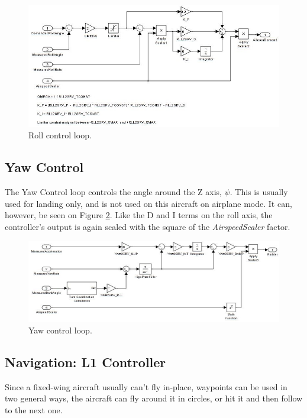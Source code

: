 \begin{figure}[H]
\centering
  \includegraphics[width=\linewidth]{figs/roll_control_loop.jpg}
  \caption{Roll control loop.}
  \label{fig:roll_loop}
\end{figure}

\subsection{Yaw Control}
The Yaw Control loop controls the angle around the Z axis, $\psi$. This is usually used for landing only, and is not used on this aircraft on airplane mode. It can, however, be seen on Figure \ref{fig:yaw_loop}.
Like the D and I terms on the roll axis, the controller's output is again scaled with the square of the \textit{AirspeedScaler} factor.

\begin{figure}[H]
\centering
  \includegraphics[width=\linewidth]{figs/yaw_control_loop.jpg}
  \caption{Yaw control loop.}
  \label{fig:yaw_loop}
\end{figure}

\subsection{Navigation: L1 Controller}

%
%
Since a fixed-wing aircraft usually can't fly in-place, waypoints can be used in two general ways, the aircraft can fly around it in circles, or hit it and then follow to the next one.

